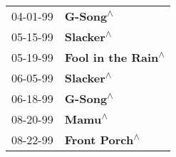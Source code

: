 \begin{supertabular}{p{0.25\columnwidth}p{0.75\columnwidth}}
 04-01-99 &            \textbf{G-Song\textsuperscript{$\wedge$}} \\
 05-15-99 &           \textbf{Slacker\textsuperscript{$\wedge$}} \\
 05-19-99 &  \textbf{Fool in the Rain\textsuperscript{$\wedge$}} \\
 06-05-99 &           \textbf{Slacker\textsuperscript{$\wedge$}} \\
 06-18-99 &            \textbf{G-Song\textsuperscript{$\wedge$}} \\
 08-20-99 &              \textbf{Mamu\textsuperscript{$\wedge$}} \\
 08-22-99 &       \textbf{Front Porch\textsuperscript{$\wedge$}} \\
\end{supertabular}
